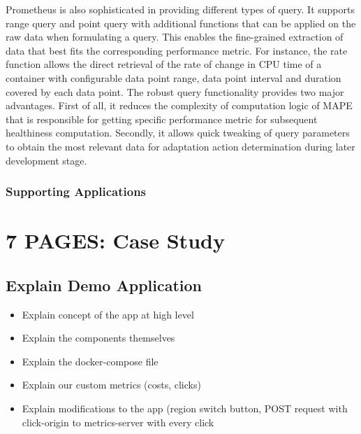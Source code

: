\documentclass{seal_thesis}
\begin{document}
Prometheus is also sophisticated in providing different types of query.
It supports range query and point query with additional functions that can be applied on the raw data when formulating a query.
This enables the fine-grained extraction of data that best fits the corresponding performance metric.
For instance, the rate function allows the direct retrieval of the rate of change in CPU time of a container with configurable data point range, data point interval and duration covered by each data point.
The robust query functionality provides two major advantages.
First of all, it reduces the complexity of computation logic of MAPE that is responsible for getting specific performance metric for subsequent healthiness computation.
Secondly, it allows quick tweaking of query parameters to obtain the most relevant data for adaptation action determination during later development stage. 

\subsection{Supporting Applications}



\chapter{7 PAGES: Case Study}

\section{Explain Demo Application}
\begin{itemize}
	\item Explain concept of the app at high level
	\item Explain the components themselves
	\item Explain the docker-compose file
	\item Explain our custom metrics (costs, clicks)
	\item Explain modifications to the app (region switch button, POST request with click-origin to metrics-server with every click
\end{itemize}
\end{document}
